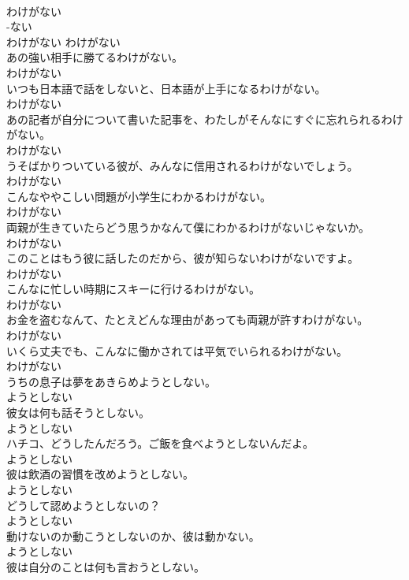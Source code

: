 \documentclass[8pt]{extreport}
\begin{document}
\begin{CJK}{UTF8}{min}
\\	わけがない	
\\	-ない
\\	わけがない	わけがない
\\	あの強い相手に勝てるわけがない。	
\\	わけがない
\\	いつも日本語で話をしないと、日本語が上手になるわけがない。	
\\	わけがない
\\	あの記者が自分について書いた記事を、わたしがそんなにすぐに忘れられるわけがない。	
\\	わけがない
\\	うそばかりついている彼が、みんなに信用されるわけがないでしょう。	
\\	わけがない
\\	こんなややこしい問題が小学生にわかるわけがない。	
\\	わけがない
\\	両親が生きていたらどう思うかなんて僕にわかるわけがないじゃないか。	
\\	わけがない
\\	このことはもう彼に話したのだから、彼が知らないわけがないですよ。	
\\	わけがない
\\	こんなに忙しい時期にスキーに行けるわけがない。	
\\	わけがない
\\	お金を盗むなんて、たとえどんな理由があっても両親が許すわけがない。	
\\	わけがない
\\	いくら丈夫でも、こんなに働かされては平気でいられるわけがない。	
\\	わけがない
\\	うちの息子は夢をあきらめようとしない。	
\\	ようとしない
\\	彼女は何も話そうとしない。	
\\	ようとしない
\\	ハチコ、どうしたんだろう。ご飯を食べようとしないんだよ。	
\\	ようとしない
\\	彼は飲酒の習慣を改めようとしない。	
\\	ようとしない
\\	どうして認めようとしないの？	
\\	ようとしない
\\	動けないのか動こうとしないのか、彼は動かない。	
\\	ようとしない
\\	彼は自分のことは何も言おうとしない。	

\end{CJK}
\end{document}
